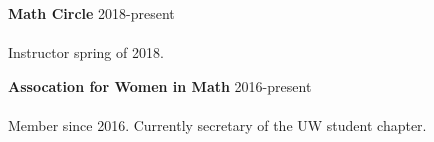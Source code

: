 \documentclass[12 pt]{article}
\newcommand{\lineunder}{\vspace*{-8pt} \\ \hspace*{-18pt} \hrulefill \\}
\newcommand{\header}[1]{{\hspace*{-15pt}\vspace*{6pt} \selectfont{\textsc{#1}}} \vspace*{-6pt} \lineunder}
\newcommand{\employer}[3]{{ \textbf{#1} \hfill #2 \\ #3\\  }}
\begin{document}
\employer{Math Circle}{2018-present}{~}
\vspace{-5mm}
Instructor spring of 2018.


\bigskip
\employer{Assocation for Women in Math}{2016-present}{~}
\vspace{-5mm}
Member since 2016. Currently secretary of the UW student chapter.















\end{document}
